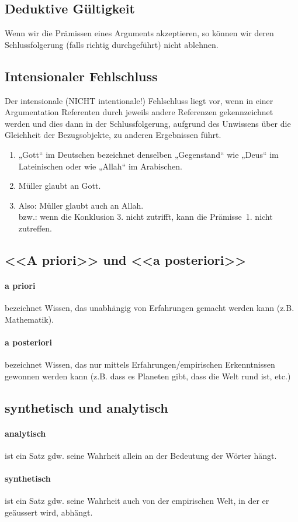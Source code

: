 \documentclass[../main.tex]{subfiles}
\begin{document}
\subsection{Deduktive Gültigkeit}
Wenn wir die Prämissen eines Arguments akzeptieren, so können wir deren Schlussfolgerung (falls richtig durchgeführt) nicht ablehnen. 

\subsection{Intensionaler Fehlschluss}
Der intensionale (NICHT intentionale!) Fehlschluss liegt vor, wenn in einer Argumentation Referenten durch jeweils andere Referenzen gekennzeichnet werden und dies dann in der Schlussfolgerung, aufgrund des Unwissens über die Gleichheit der Bezugsobjekte, zu anderen Ergebnissen führt. 
\begin{enumerate}
	\item „Gott“ im Deutschen bezeichnet denselben „Gegenstand“ wie „Deus“ im Lateinischen oder wie „Allah“ im Arabischen.
	\item Müller glaubt an Gott.
	\item Also: Müller glaubt auch an Allah. \\
		bzw.: wenn die Konklusion 3. nicht zutrifft, kann die Prämisse 1. nicht zutreffen.
\end{enumerate}

\subsection{<<A priori>> und <<a posteriori>>}
\paragraph{a priori} bezeichnet Wissen, das unabhängig von Erfahrungen gemacht werden kann (z.B. Mathematik).
\paragraph{a posteriori} bezeichnet Wissen, das nur mittels Erfahrungen/empirischen Erkenntnissen gewonnen werden kann (z.B. dass es Planeten gibt, dass die Welt rund ist, etc.)

\subsection{synthetisch und analytisch}
\paragraph{analytisch} ist ein Satz gdw. seine Wahrheit allein an der Bedeutung der Wörter hängt.
\paragraph{synthetisch} ist ein Satz gdw. seine Wahrheit auch von der empirischen Welt, in der er geäussert wird, abhängt. 
\end{document}
